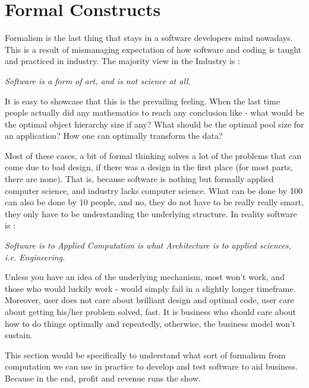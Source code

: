 \chapter{Formal Constructs}\label{using-predicates}

{\LARGE F}ormalism is the last thing that stays in a software developers mind nowadays. 
This is a result of mismanaging expectation of how software and coding is taught and practiced in industry.
The majority view in the Industry is :
\begin{center}
\emph{Software is a form of art, and is not science at all}. 
\end{center}
It is easy to showcase that this is the prevailing feeling. When the last time people
actually did any mathematics to reach any conclusion like - what would be the optimal
object hierarchy size if any? What should be the optimal pool size for an application?
How one can optimally transform the data? 

Most of these cases, a bit of formal thinking solves a lot of the problems that can come due to bad design,
if there was a design in the first place (for most parts, there are none). 
That is, because software is nothing but formally applied computer science, and industry lacks computer science.
What can be done by 100 can also be done by 10 people, and no, they do not have to be really really smart,
they only have to be understanding the underlying structure. 
In reality software is :

\begin{center}
\emph{Software is to Applied Computation is what Architecture is to applied sciences, i.e. Engineering.}
\end{center}
Unless you have an idea of the underlying mechanism, most won't work,
and those who would luckily work - would simply fail in a slightly longer timeframe.
Moreover, user does not care about brilliant design and optimal code, user care about getting his/her problem 
solved, fast. It is business who should care about how to do things optimally and repeatedly, otherwise,
the business model won't sustain. 

This section would be specifically to understand what sort of formalism from computation 
we can use in practice to develop and test software to aid business. Because in the end, profit and revenue 
runs the show.


